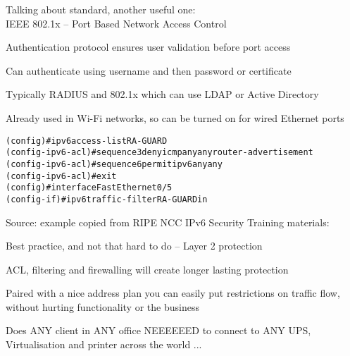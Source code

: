 \documentclass[Screen16to9,17pt]{foils}
\begin{document}

Talking about standard, another useful one:\\
IEEE 802.1x -- Port Based Network Access Control


\begin{list1}
\item Authentication protocol ensures user validation before port access
\item Can authenticate using username and then password or certificate
\item Typically RADIUS and 802.1x which can use LDAP or Active Directory
\item Already used in Wi-Fi networks, so can be turned on for wired Ethernet ports
\end{list1}




\begin{alltt}\small
 (config)#ipv6 access-list RA-GUARD
 (config-ipv6-acl)#sequence 3 deny icmp any any router-advertisement
 (config-ipv6-acl)#sequence 6 permit ipv6 any any
 (config-ipv6-acl)#exit
 (config)#interface FastEthernet0/5
 (config-if)#ipv6 traffic-filter RA-GUARD in
\end{alltt}
Source: example copied from RIPE NCC IPv6 Security Training materials:\\

\begin{list2}
\item Best practice, and not that hard to do -- Layer 2 protection
\item ACL, filtering and firewalling will create longer lasting protection
\item Paired with a nice address plan you can easily put restrictions on traffic flow, without hurting functionality or the business
\item Does ANY client in ANY office NEEEEEED to connect to ANY UPS, Virtualisation and printer across the world ...
\end{list2}





\end{document}
